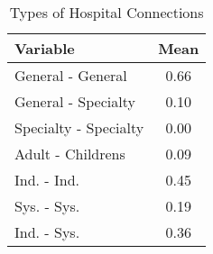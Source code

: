 \begin{table}[ht!]
\centering
\caption{Types of Hospital Connections}
\centering
\begin{tabular}[t]{lc}
\toprule
Variable & Mean\\
\midrule
General - General & 0.66\\
General - Specialty & 0.10\\
Specialty - Specialty & 0.00\\
\addlinespace
Adult - Childrens & 0.09\\
\addlinespace
Ind. - Ind. & 0.45\\
Sys. - Sys. & 0.19\\
Ind. - Sys. & 0.36\\
\bottomrule
\end{tabular}
\end{table}
